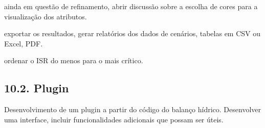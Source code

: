 \documentclass[a4paper,10pt,brazil]{sphinxmanual}
\begin{document}
\sphinxAtStartPar
{} ainda em questão de refinamento, abrir discussão sobre a escolha de cores para a visualização dos atributos.

\sphinxAtStartPar
{} exportar os resultados, gerar relatórios dos dados de cenários, tabelas em CSV ou Excel, PDF.

\sphinxAtStartPar
{} ordenar o ISR do menos para o mais crítico.


\subsection{10.2. Plugin}
\label{\detokenize{10proximosPassos:plugin}}
\sphinxAtStartPar
Desenvolvimento de um plugin a partir do código do balanço hídrico. Desenvolver uma interface, incluir funcionalidades adicionais que possam ser úteis.



\renewcommand{\indexname}{Índice}
\printindex
\end{document}
